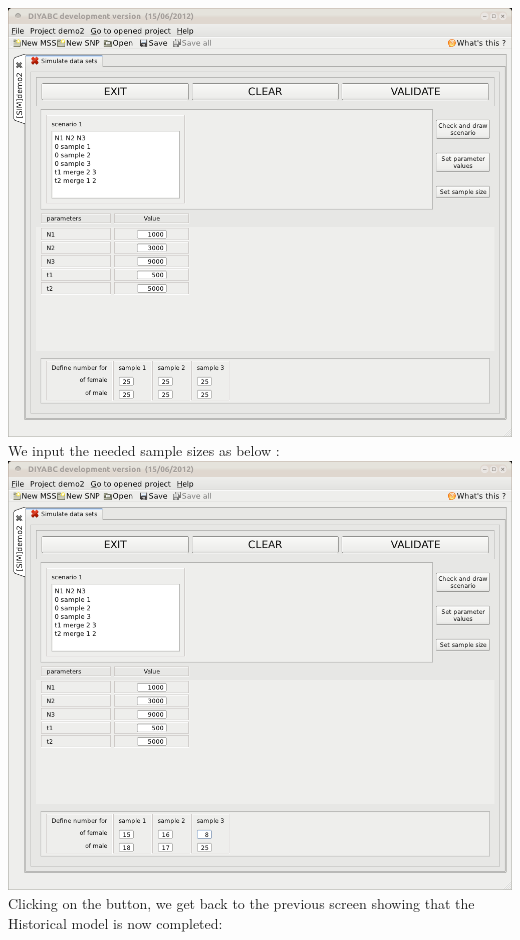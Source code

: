 \includegraphics[scale=0.33]{gui_pictures/Capture-DIYABC-68.png} \\

We input the needed sample sizes as below :\\

\includegraphics[scale=0.33]{gui_pictures/Capture-DIYABC-69.png} \\

Clicking on the  button, we get back to the previous screen showing that the Historical model is now completed:\\

